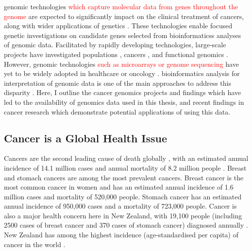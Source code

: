 \Gls{genomic} technologies \textcolor{red}{which capture molecular data from genes throughout the genome} are expected to significantly impact on the clinical treatment of \glspl{cancer}, along with wider applications of genetics \citep{Goodwin2016, Roychowdhury2016}. These technologies enable focused genetic investigations on candidate genes selected from \glspl{bioinformatics} analyses of \gls{genomic} data. Facilitated by rapidly developing technologies, large-scale projects have investigated populations \citep{1000Genomes2010}, \glspl{cancer} \citep{Dickson1999, ICGC2011}, and functional \glspl{genomic} \citep{ENCODE2004, FANTOM2001}. However, \gls{genomic} technologies \textcolor{red}{such as microarrays or genome sequencing} have yet to be widely adopted in healthcare or oncology \citep{Roychowdhury2016, Waldron2016}. \Gls{bioinformatics} analysis for interpretation of \gls{genomic} data is one of the main approaches to address this disparity \citep{Goodwin2016}. Here, I outline the \gls{cancer} \glspl{genomic} projects and findings which have led to the availability of \glspl{genomic} data used in this thesis, and recent findings in \gls{cancer} research which demonstrate potential applications of using this data. 

\subsection{Cancer is a Global Health Issue}
Cancers are the second leading cause of death globally \citep{WorldHealthOrg2017}, with an estimated annual incidence of 14.1 million cases and annual mortality of 8.2 million people \citep{Ferlay2015}. Breast and stomach \glspl{cancer} are among the most prevalent \glspl{cancer}. Breast cancer is the most common \gls{cancer} in women and has an estimated annual incidence of 1.6 million cases and mortality of 520,000 people. Stomach cancer has an estimated annual incidence of 950,000 cases and a mortality of 723,000 people. Cancer is also a major health concern here in New Zealand, with 19,100 people (including 2500 cases of breast cancer and 370 cases of stomach cancer) diagnosed annually \citep{CIX2013}. New Zealand has among the highest incidence (age-standardised per capita) of \gls{cancer} in the world \citep{Ferlay2015}.   

